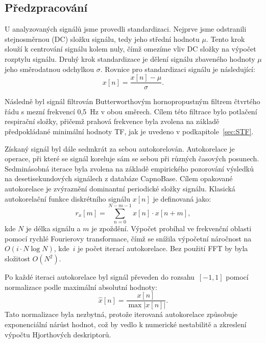 \subsection*{Předzpracování}
\label{sec:predzpracovani}
U analyzovaných signálů jsme provedli standardizaci.
Nejprve jsme odstranili stejnosměrnou (\acs{DC}) složku signálu, tedy jeho střední hodnotu \(\mu\).
Tento krok slouží k centrování signálu kolem nuly, čímž omezíme vliv \acs{DC} složky na výpočet rozptylu signálu.
Druhý krok standardizace je dělení signálu zbaveného hodnoty \(\mu\) jeho směrodatnou odchylkou \(\sigma\).
Rovnice pro standardizaci signálu je následující:
\begin{equation}
	\label{eq:standardizace}
	x[n] = \frac{x[n] - \mu}{\sigma}.
\end{equation}

Následně byl signál filtrován Butterworthovým hornopropustným filtrem čtvrtého řádu s mezní frekvencí 0,5~Hz v obou směrech.
Cílem této filtrace bylo potlačení respirační složky, přičemž prahová frekvence byla zvolena na základě předpokládané minimální hodnoty \acs{TF}, jak je uvedeno v podkapitole~\ref{sec:STF}.

Získaný signál byl dále sedmkrát za sebou autokorelován.
Autokorelace je operace, při které se signál koreluje sám se sebou při různých časových posunech.
Sedminásobná iterace byla zvolena na základě empirického pozorování výsledků na desetisekundových signálech z databáze CapnoBase.
Cílem opakované autokorelace je zvýraznění dominantní periodické složky signálu.
Klasická autokorelační funkce diskrétního signálu \( x[n] \) je definovaná jako:
\begin{equation}
	r_x[m] = \sum_{n=0}^{N-m-1} x[n] \cdot x[n+m],
\end{equation}
kde \( N \) je délka signálu a \( m \) je zpoždění.
Výpočet probíhal ve frekvenční oblasti pomocí rychlé Fourierovy transformace, čímž se snížila výpočetní náročnost na~\(O(i \cdot N \log N)\), kde~\(i\) je počet iterací autokorelace.
Bez použití \acs{FFT} by byla složitost \(O(N^2)\).

Po každé iteraci autokorelace byl signál převeden do rozsahu~\([-1, 1]\) pomocí normalizace podle maximální absolutní hodnoty:
\begin{equation}
	\hat{x}[n] = \frac{x[n]}{\max |x[n]|}.
\end{equation}
Tato normalizace byla nezbytná, protože iterovaná autokorelace způsobuje exponenciální nárůst hodnot, což by vedlo k numerické nestabilitě a zkreslení výpočtu Hjorthových deskriptorů.

